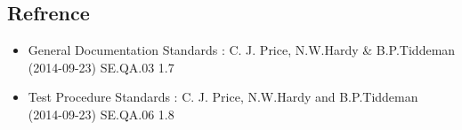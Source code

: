 \subsection{Refrence}
	\begin{itemize}
		\item General Documentation Standards : C. J. Price, N.W.Hardy \& B.P.Tiddeman (2014-09-23) SE.QA.03 1.7
		\item Test Procedure Standards : C. J. Price, N.W.Hardy and B.P.Tiddeman (2014-09-23) SE.QA.06 1.8
		
	\end{itemize}
